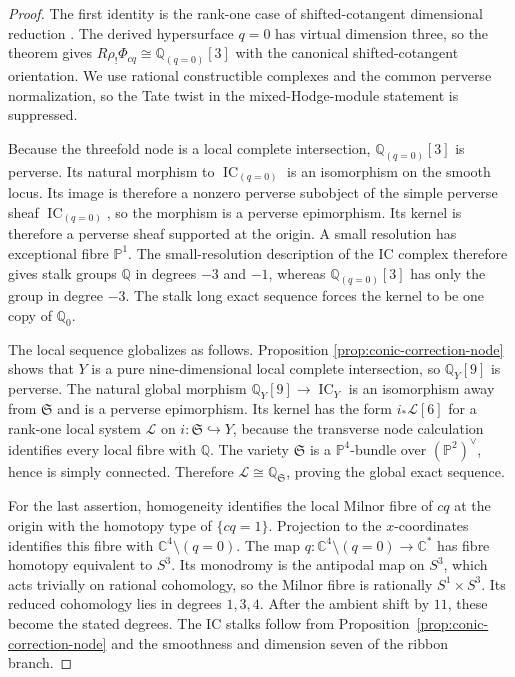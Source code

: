 \documentclass[11pt,reqno]{amsart}
\theoremstyle{definition}
\newcommand{\Q}{\mathbb Q}
\newcommand{\Pp}{\mathbb P}
\newcommand{\IC}{\operatorname{IC}}
\begin{document}
\begin{proof}
The first identity is the rank-one case of shifted-cotangent dimensional
reduction \cite[Theorem~3.1]{Kinjo}.  The derived hypersurface $q=0$ has
virtual dimension three, so the theorem gives
$R\rho_!\Phi_{cq}\cong\Q_{(q=0)}[3]$ with the canonical
shifted-cotangent orientation.  We use rational constructible complexes and
the common perverse normalization, so the Tate twist in the
mixed-Hodge-module statement is suppressed.

Because the threefold node is a local complete intersection,
$\Q_{(q=0)}[3]$ is perverse.  Its natural morphism to
$\IC_{(q=0)}$ is an isomorphism on the smooth locus.  Its image is therefore
a nonzero perverse subobject of the simple perverse sheaf
$\IC_{(q=0)}$, so the morphism is a perverse epimorphism.  Its kernel is
therefore a perverse sheaf supported at the origin.  A small resolution has
exceptional fibre $\Pp^1$.  The small-resolution description of the IC
complex therefore gives stalk groups $\Q$ in degrees $-3$ and $-1$, whereas
$\Q_{(q=0)}[3]$ has only the group in degree $-3$.  The stalk long exact
sequence forces the kernel to be one copy of $\Q_0$.

The local sequence globalizes as follows.  Proposition
\ref{prop:conic-correction-node} shows that $Y$ is a pure
nine-dimensional local complete intersection, so $\Q_Y[9]$ is perverse.
The natural global morphism $\Q_Y[9]\to\IC_Y$ is an isomorphism away from
$\mathfrak S$ and is a perverse epimorphism.  Its kernel has the form
$i_*\mathcal L[6]$ for a rank-one local system $\mathcal L$ on
$i:\mathfrak S\hookrightarrow Y$, because the transverse node calculation
identifies every local fibre with $\Q$.  The variety $\mathfrak S$ is a
$\Pp^4$-bundle over $(\Pp^2)^\vee$, hence is simply connected.  Therefore
$\mathcal L\cong\Q_{\mathfrak S}$, proving the global exact sequence.

For the last assertion, homogeneity identifies the local Milnor fibre of
$cq$ at the origin with the homotopy type of $\{cq=1\}$.  Projection to the
$x$-coordinates identifies this fibre with
$\mathbb C^4\setminus(q=0)$.  The map
$q:\mathbb C^4\setminus(q=0)\to\mathbb C^*$ has fibre homotopy equivalent
to $S^3$.  Its monodromy is the antipodal map on $S^3$, which acts trivially
on rational cohomology, so the Milnor fibre is rationally
$S^1\times S^3$.  Its reduced cohomology lies in degrees $1,3,4$.
After the ambient shift by $11$, these become the stated degrees.  The IC
stalks follow from Proposition~\ref{prop:conic-correction-node} and the
smoothness and dimension seven of the ribbon branch.
\end{proof}
\end{document}
